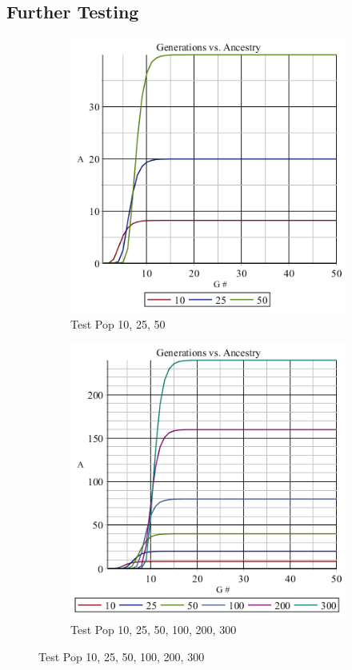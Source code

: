 \documentclass[12pt]{extarticle}
\begin{document}
\subsection{Further Testing}

\begin{figure}[h!]
	\caption{Non-unique Test}
	\begin{subfigure}{0.50\textwidth}
	\includegraphics[scale=0.55]{Graph2.png}
	\caption{Test Pop 10, 25, 50}
	\label{fig:img2}
	\end{subfigure}
	\begin{subfigure}{0.50\textwidth}
	\includegraphics[scale=0.50]{Graph3.png}
	\caption{Test Pop 10, 25, 50, 100, 200, 300}
	\label{fig:img3}
	\end{subfigure}

\end{figure}
\end{document}
